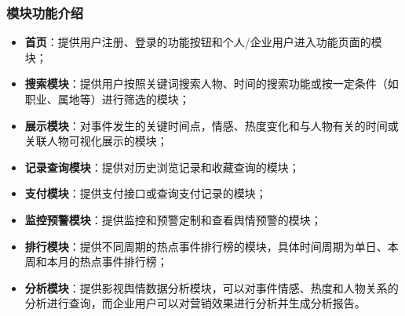\subsubsection{模块功能介绍}

\begin{itemize}
	\item \textbf{首页}：提供用户注册、登录的功能按钮和个人/企业用户进入功能页面的模块；
	\item \textbf{搜索模块}：提供用户按照关键词搜索人物、时间的搜索功能或按一定条件（如职业、属地等）进行筛选的模块；
	\item \textbf{展示模块}：对事件发生的关键时间点，情感、热度变化和与人物有关的时间或关联人物可视化展示的模块；
	\item \textbf{记录查询模块}：提供对历史浏览记录和收藏查询的模块；
	\item \textbf{支付模块}：提供支付接口或查询支付记录的模块；
	\item \textbf{监控预警模块}：提供监控和预警定制和查看舆情预警的模块；
	\item \textbf{排行模块}：提供不同周期的热点事件排行榜的模块，具体时间周期为单日、本周和本月的热点事件排行榜；
	\item \textbf{分析模块}：提供影视舆情数据分析模块，可以对事件情感、热度和人物关系的分析进行查询，而企业用户可以对营销效果进行分析并生成分析报告。
	
\end{itemize}